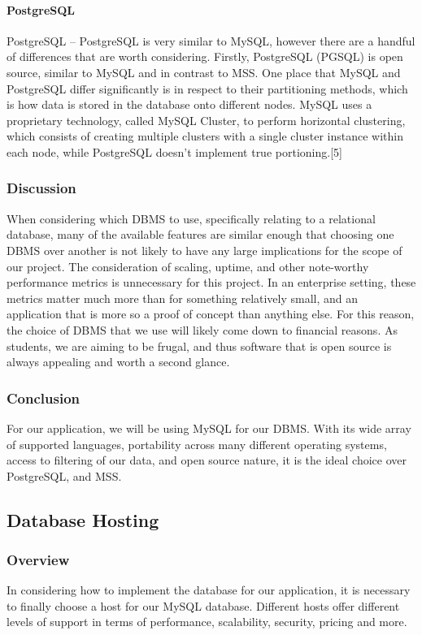 \documentclass[onecolumn, draftclsnofoot,10pt, compsoc]{IEEEtran}
\begin{document}
 
\paragraph{PostgreSQL}
PostgreSQL – PostgreSQL is very similar to MySQL, however there are a handful of differences that are worth considering. Firstly, PostgreSQL (PGSQL) is open source, similar to MySQL and in contrast to MSS. One place that MySQL and PostgreSQL differ significantly is in respect to their partitioning methods, which is how data is stored in the database onto different nodes. MySQL uses a proprietary technology, called MySQL Cluster, to perform horizontal clustering, which consists of creating multiple clusters with a single cluster instance within each node, while PostgreSQL doesn't implement true portioning.[5]

\subsubsection{Discussion}
When considering which DBMS to use, specifically relating to a relational database, many of the available features are similar enough that choosing one DBMS over another is not likely to have any large implications for the scope of our project. The consideration of scaling, uptime, and other note-worthy performance metrics is unnecessary for this project. In an enterprise setting, these metrics matter much more than for something relatively small, and an application that is more so a proof of concept than anything else. For this reason, the choice of DBMS that we use will likely come down to financial reasons. As students, we are aiming to be frugal, and thus software that is open source is always appealing and worth a second glance.


\subsubsection{Conclusion}
For our application, we will be using MySQL for our DBMS. With its wide array of supported languages, portability across many different operating systems, access to filtering of our data, and open source nature, it is the ideal choice over PostgreSQL, and MSS. 

\subsection{Database Hosting}

\subsubsection{Overview}
In considering how to implement the database for our application, it is necessary to finally choose a host for our MySQL database. Different hosts offer different levels of support in terms of performance, scalability, security, pricing and more.
\end{document}
